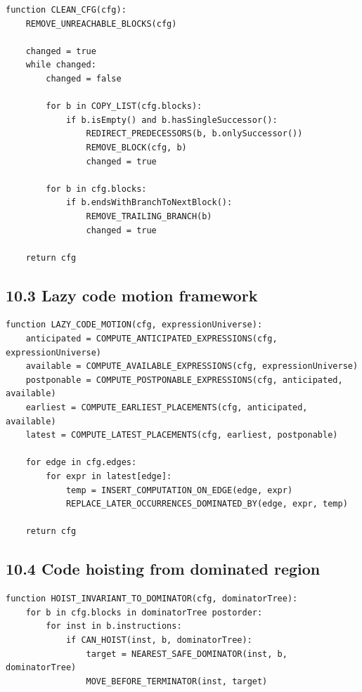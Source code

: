 \documentclass[10pt,letterpaper]{article}
\begin{document}
\begin{verbatim}
function CLEAN_CFG(cfg):
    REMOVE_UNREACHABLE_BLOCKS(cfg)

    changed = true
    while changed:
        changed = false

        for b in COPY_LIST(cfg.blocks):
            if b.isEmpty() and b.hasSingleSuccessor():
                REDIRECT_PREDECESSORS(b, b.onlySuccessor())
                REMOVE_BLOCK(cfg, b)
                changed = true

        for b in cfg.blocks:
            if b.endsWithBranchToNextBlock():
                REMOVE_TRAILING_BRANCH(b)
                changed = true

    return cfg
\end{verbatim}

\subsection*{10.3 Lazy code motion framework}

\begin{verbatim}
function LAZY_CODE_MOTION(cfg, expressionUniverse):
    anticipated = COMPUTE_ANTICIPATED_EXPRESSIONS(cfg, expressionUniverse)
    available = COMPUTE_AVAILABLE_EXPRESSIONS(cfg, expressionUniverse)
    postponable = COMPUTE_POSTPONABLE_EXPRESSIONS(cfg, anticipated, available)
    earliest = COMPUTE_EARLIEST_PLACEMENTS(cfg, anticipated, available)
    latest = COMPUTE_LATEST_PLACEMENTS(cfg, earliest, postponable)

    for edge in cfg.edges:
        for expr in latest[edge]:
            temp = INSERT_COMPUTATION_ON_EDGE(edge, expr)
            REPLACE_LATER_OCCURRENCES_DOMINATED_BY(edge, expr, temp)

    return cfg
\end{verbatim}

\subsection*{10.4 Code hoisting from dominated region}

\begin{verbatim}
function HOIST_INVARIANT_TO_DOMINATOR(cfg, dominatorTree):
    for b in cfg.blocks in dominatorTree postorder:
        for inst in b.instructions:
            if CAN_HOIST(inst, b, dominatorTree):
                target = NEAREST_SAFE_DOMINATOR(inst, b, dominatorTree)
                MOVE_BEFORE_TERMINATOR(inst, target)
\end{verbatim}
\end{document}
